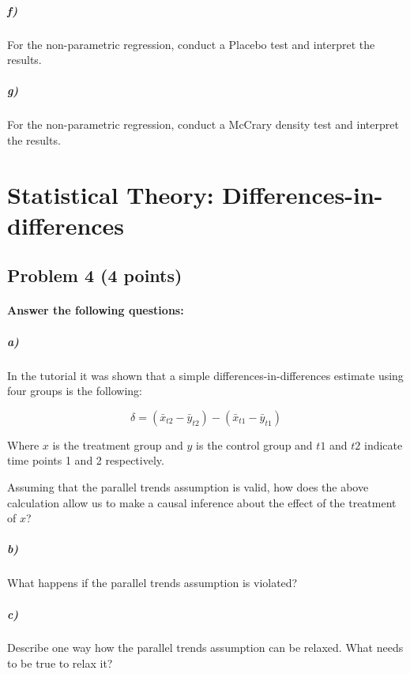 \documentclass[12pt]{article}
\begin{document}
\subparagraph{f)} For the non-parametric regression, conduct a Placebo test and interpret the results.

\subparagraph{g)} For the non-parametric regression, conduct a McCrary density test and interpret the results.




\section*{Statistical Theory: Differences-in-differences}

\subsection*{Problem 4 (4 points)}

\paragraph{Answer the following questions:}

\subparagraph*{a)} In the tutorial it was shown that a simple differences-in-differences estimate using four groups is the following:

$$ \delta = (\bar{x} _{t2} - \bar{y} _{t2}) - (\bar{x} _{t1} - \bar{y} _{t1}) $$

Where $x$ is the treatment group and $y$ is the control group and $t1$ and $t2$ indicate time points 1 and 2 respectively.

Assuming that the parallel trends assumption is valid, how does the above calculation allow us to make a causal inference about the effect of the treatment of $x$?

\subparagraph*{b)} What happens if the parallel trends assumption is violated?

\subparagraph*{c)} Describe one way how the parallel trends assumption can be relaxed. What needs to be true to relax it?
\end{document}
